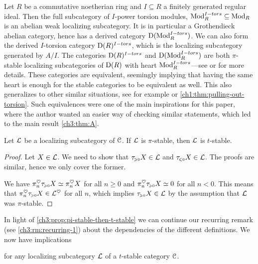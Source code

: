 \begin{example}
    \label{ch3:ex:abelian-torsion}
    Let $R$ be a commutative noetherian ring and $I\subseteq R$ a finitely generated regular ideal. Then the full subcategory of $I$-power torsion modules, $\mathrm{Mod}_R^{I-tors}\subseteq \mathrm{Mod}_R$ is an abelian weak localizing subcategory. It is in particular a Grothendieck abelian category, hence has a derived category $\mathrm{D}(\mathrm{Mod}_R^{I-tors})$. We can also form the derived $I$-torsion category $\mathrm{D}(R)^{I-tors}$, which is the localizing subcategory generated by $A/I$. The categories $\mathrm{D}(R)^{I-tors}$ and $\mathrm{D}(\mathrm{Mod}_R^{I-tors})$ are both $\pi$-stable localizing subcategories of $\mathrm{D}(R)$ with heart $\mathrm{Mod}_R^{I-tors}$---see \cite{greenlees-may_92} or \cite{barthel-heard-valenzuela_2018} for more details. These categories are equivalent, seemingly implying that having the same heart is enough for the stable categories to be equivalent as well. This also generalizes to other similar situations, see for example \cite[3.15, 3.17]{barthel-heard-valenzuela_2020} or \cref{ch1:thm:pulling-out-torsion}. Such equivalences were one of the main inspirations for this paper, where the author wanted an easier way of checking similar statements, which led to the main result \cref{ch3:thm:A}. 
\end{example}

\begin{proposition}
    \label{ch3:prop:pi-stable-then-t-stable}
    Let $\mathcal{L}$ be a localizing subcategory of $\EuScript{C}$. If $\mathcal{L}$ is $\pi$-stable, then $\mathcal{L}$ is $t$-stable. 
\end{proposition}
\begin{proof}
    Let $X\in \mathcal{L}$. We need to show that $\tau_{\hspace{-1pt}\scriptscriptstyle\geqslant 0} X\in \mathcal{L}$ and $\tau_{\hspace{-1pt}\scriptscriptstyle\leqslant 0} X\in \mathcal{L}$. The proofs are similar, hence we only cover the former. 
    
    We have $\pi_n^\heartsuit \tau_{\hspace{-1pt}\scriptscriptstyle\geqslant 0} X \simeq \pi_n^\heartsuit X$ for all $n\geq 0$ and $\pi_n^\heartsuit \tau_{\hspace{-1pt}\scriptscriptstyle\geqslant 0} X\simeq 0$ for all $n<0$. This means that $\pi_n^\heartsuit \tau_{\hspace{-1pt}\scriptscriptstyle\geqslant 0} X \in \mathcal{L}^\heartsuit$ for all $n$, which implies $\tau_{\hspace{-1pt}\scriptscriptstyle\geqslant 0} X \in \mathcal{L}$ by the assumption that $\mathcal{L}$ was $\pi$-stable. 
\end{proof}

\begin{remark}
    \label{ch3:rm:recurring-2}
    In light of \cref{ch3:prop:pi-stable-then-t-stable} we can continue our recurring remark (see \cref{ch3:rm:recurring-1}) about the dependencies of the different definitions. We now have implications
    \begin{center}
    \end{center}
    for any localizing subcategory $\mathcal{L}$ of a $t$-stable category $\EuScript{C}$. 
\end{remark}

